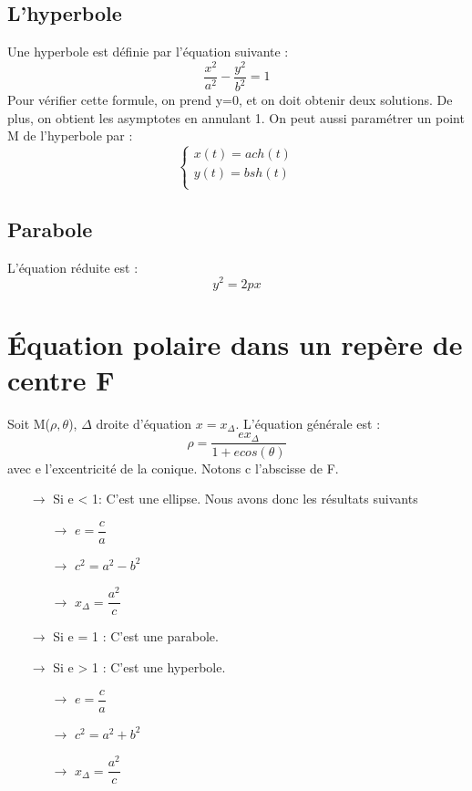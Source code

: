 \subsection{L'hyperbole}
Une hyperbole est définie par l'équation suivante : 
$$\dfrac{x^2}{a^2} - \dfrac{y^2}{b^2} = 1$$
Pour vérifier cette formule, on prend y=0, et on doit obtenir deux solutions. De plus, on obtient les asymptotes en annulant 1. On peut aussi paramétrer un point M de l'hyperbole par : 
 \[\left\{\begin{array}{l}
   x(t) = ach(t)\\
   y(t) = bsh(t) \\
  \end{array}\right.\] 
\subsection{Parabole}
L'équation réduite est : 
$$y^2 = 2px$$
\section{Équation polaire dans un repère de centre F}
Soit M($\rho,\theta$), $\Delta$ droite d'équation $x = x_{\Delta}$. L'équation générale est :
$$\rho = \dfrac{ex_{\Delta}}{1+ecos(\theta)}$$
avec e l'excentricité de la conique. Notons c l'abscisse de F.
\begin{itemize}
 \item[$\rightarrow$] Si e < 1: C'est une ellipse. Nous avons donc les résultats suivants \\
\begin{itemize}
 \item[$\rightarrow$] $e = \dfrac{c}{a}$\\
 \item[$\rightarrow$] $c^2 = a^2 - b^2$\\
 \item[$\rightarrow$] $x_{\Delta} = \dfrac{a^2}{c}$\\
\end{itemize}
 \item[$\rightarrow$] Si e = 1 : C'est une parabole.\\
 \item[$\rightarrow$] Si e > 1 : C'est une hyperbole.\\
\begin{itemize}
 \item[$\rightarrow$] $e = \dfrac{c}{a}$\\
 \item[$\rightarrow$] $c^2 = a^2 + b^2$\\
 \item[$\rightarrow$] $x_{\Delta} = \dfrac{a^2}{c}$\\
\end{itemize}
\end{itemize}
